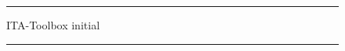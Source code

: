 

\thispagestyle{empty}

\begin{titlepage}

\begin{figure}[ht]
\begin{minipage}{.12\textwidth}
\colorbox{bhear}    %
	{
	\begin{minipage}[c]{.9\textwidth}
	\vspace{299mm}
 	$\,$ 
	\end{minipage}
	}
\end{minipage}
\hfill
\begin{minipage}{.83\textwidth}
	
\begin{center}
{\rule[1.1em]{.9\linewidth}{.1pt}}\hfill
     ITA-Toolbox initial 
{\rule[0.1em]{.9\linewidth}{.1pt}}\hfill
\end{center}
	

	
  \begin{minipage}[t]{1\linewidth}
		\sffamily
\hspace{.7cm}	%


		
	\vspace{2cm}
	\vspace{.4cm}
	
		\vspace{2cm}
		



\end{minipage}
\end{minipage}
\end{figure}
\end{titlepage}
